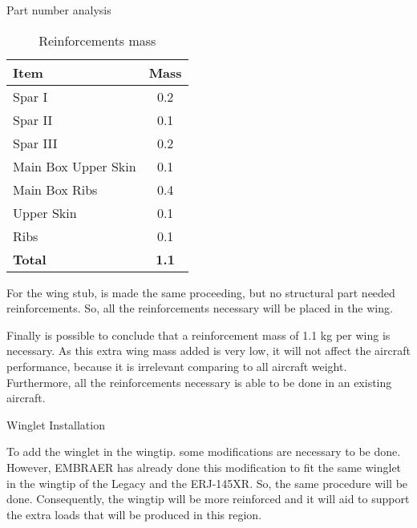 \begin{table}[H]
\caption{Part number analysis}
\label{tab:tab1_Part_number_analysis}
\end{table}

\begin{table}[H]
  \centering
  \caption{Reinforcements mass}
    \begin{tabular}{lc}
    \toprule
    \textbf{Item} & \textbf{Mass} \\
    \midrule
    Spar I & 0.2 \\
    Spar II & 0.1 \\
    Spar III & 0.2 \\
    Main Box Upper Skin & 0.1 \\
    Main Box Ribs & 0.4 \\
    Upper Skin & 0.1 \\
    Ribs  & 0.1 \\
    \textbf{Total} & \textbf{1.1} \\
    \bottomrule
    \end{tabular}%
  \label{tab:ta2_Reinforcements_mass}%
\end{table}%

For the wing stub, is made the same proceeding, but no structural part needed reinforcements. So, all the reinforcements necessary will be placed in the wing.

Finally is possible to conclude that a reinforcement mass of 1.1 kg per wing is necessary. As this extra wing mass added is very low, it will not affect the aircraft performance, because it is irrelevant comparing to all aircraft weight. Furthermore, all the reinforcements necessary is able to be done in an existing aircraft.

Winglet Installation

To add the winglet in the wingtip. some modifications are necessary to be done. However, EMBRAER has already done this modification to fit the same winglet in the wingtip of the Legacy and the ERJ-145XR. So, the same procedure will be done. Consequently, the wingtip will be more reinforced and it will aid to support the extra loads that will be produced in this region.
